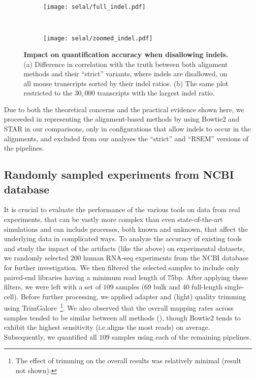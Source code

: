 \begin{figure}[t!]
    \centering
    \begin{subfigure}[t]{0.45\textwidth}
        \centering
	    \texttt{[image: selal/full\_indel.pdf]}
      \caption{\label{subfig:indel_strat_full}}
    \end{subfigure}
    ~
    \begin{subfigure}[t]{0.45\textwidth}
        \centering
	    \texttt{[image: selal/zoomed\_indel.pdf]}
      \caption{\label{subfig:indel_strat_zoomed}}
    \end{subfigure}
    \caption{\textbf{Impact on quantification accuracy when disallowing indels.} (a) Difference in correlation with the truth between both alignment
      methods and their ``strict'' variants, where indels are disallowed, on all mouse transcripts sorted by their indel ratios. (b) The same plot restricted
      to the $30,000$ transcripts with the largest indel ratio.}
    \label{fig:indelcorr}
\end{figure}

Due to both the theoretical concerns and the practical evidence shown here, we
proceeded in representing the alignment-based methods by using Bowtie2 and STAR in
our comparisons, only in configurations that allow indels to occur in the
alignments, and excluded from our analyses the ``strict'' and ``RSEM'' versions of the pipelines. 

\subsection{Randomly sampled experiments from NCBI database}
\label{subsec:experimental}

It is crucial to evaluate the performance of the various tools on data from real
experiments, that can be vastly more complex than even state-of-the-art simulations
and can include processes, both known and unknown, that affect the underlying
data in complicated ways. To analyze the accuracy of existing tools and study
the impact of the artifacts (like the above) on experimental datasets, we
randomly selected 200 human RNA-seq experiments from the NCBI database
for further investigation. We then filtered the selected samples to include
only paired-end libraries having a minimum read length of 75bp. After applying
these filters, we were left with a set of $109$ samples (69 bulk and 40 full-length single-cell). Before further
processing, we applied adapter and (light) quality trimming using TrimGalore~\cite{trimgalore, cutadapt}\footnote{The effect of trimming on the overall results was
relatively minimal (result not shown).}. We also observed that the overall mapping
rates across samples tended to be similar between all methods
(), though Bowtie2 tends to exhibit the highest sensitivity
(i.e.\@ aligns the most reads) on average.
Subsequently, we quantified all $109$ samples using each of the remaining pipelines.


